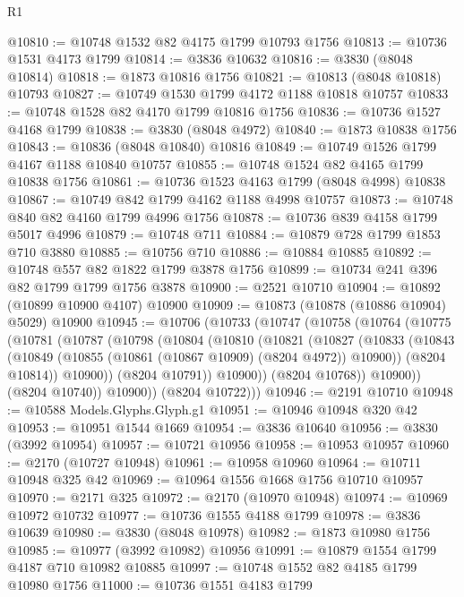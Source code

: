 \begin{lexlean}{R1}
\begin{coremodule}
@10810 := @10748 @1532 @82 @4175 @1799 @10793 @1756
@10813 := @10736 @1531 @4173 @1799
@10814 := @3836 @10632
@10816 := @3830 (@8048 @10814)
@10818 := @1873 @10816 @1756
@10821 := @10813 (@8048 @10818) @10793
@10827 := @10749 @1530 @1799 @4172 @1188 @10818 @10757
@10833 := @10748 @1528 @82 @4170 @1799 @10816 @1756
@10836 := @10736 @1527 @4168 @1799
@10838 := @3830 (@8048 @4972)
@10840 := @1873 @10838 @1756
@10843 := @10836 (@8048 @10840) @10816
@10849 := @10749 @1526 @1799 @4167 @1188 @10840 @10757
@10855 := @10748 @1524 @82 @4165 @1799 @10838 @1756
@10861 := @10736 @1523 @4163 @1799 (@8048 @4998) @10838
@10867 := @10749 @842 @1799 @4162 @1188 @4998 @10757
@10873 := @10748 @840 @82 @4160 @1799 @4996 @1756
@10878 := @10736 @839 @4158 @1799 @5017 @4996
@10879 := @10748 @711
@10884 := @10879 @728 @1799 @1853 @710 @3880
@10885 := @10756 @710
@10886 := @10884 @10885
@10892 := @10748 @557 @82 @1822 @1799 @3878 @1756
@10899 := @10734 @241 @396 @82 @1799 @1799 @1756 @3878
@10900 := @2521 @10710
@10904 := @10892 (@10899 @10900 @4107) @10900
@10909 := @10873 (@10878 (@10886 @10904) @5029) @10900
@10945 := @10706
    (@10733
      (@10747
        (@10758
          (@10764
            (@10775
              (@10781
                (@10787
                  (@10798
                    (@10804
                      (@10810
                        (@10821
                          (@10827
                            (@10833
                              (@10843
                                (@10849 (@10855 (@10861 (@10867 @10909) (@8204 @4972)) @10900))
                                (@8204 @10814))
                              @10900))
                          (@8204 @10791))
                        @10900))
                    (@8204 @10768))
                  @10900))
              (@8204 @10740))
            @10900))
        (@8204 @10722)))
@10946 := @2191 @10710
@10948 := @10588 Models.Glyphs.Glyph.g1
@10951 := @10946 @10948 @320 @42
@10953 := @10951 @1544 @1669
@10954 := @3836 @10640
@10956 := @3830 (@3992 @10954)
@10957 := @10721 @10956
@10958 := @10953 @10957
@10960 := @2170 (@10727 @10948)
@10961 := @10958 @10960
@10964 := @10711 @10948 @325 @42
@10969 := @10964 @1556 @1668 @1756 @10710 @10957
@10970 := @2171 @325
@10972 := @2170 (@10970 @10948)
@10974 := @10969 @10972 @10732
@10977 := @10736 @1555 @4188 @1799
@10978 := @3836 @10639
@10980 := @3830 (@8048 @10978)
@10982 := @1873 @10980 @1756
@10985 := @10977 (@3992 @10982) @10956
@10991 := @10879 @1554 @1799 @4187 @710 @10982 @10885
@10997 := @10748 @1552 @82 @4185 @1799 @10980 @1756
@11000 := @10736 @1551 @4183 @1799

\end{coremodule}
\end{lexlean}
